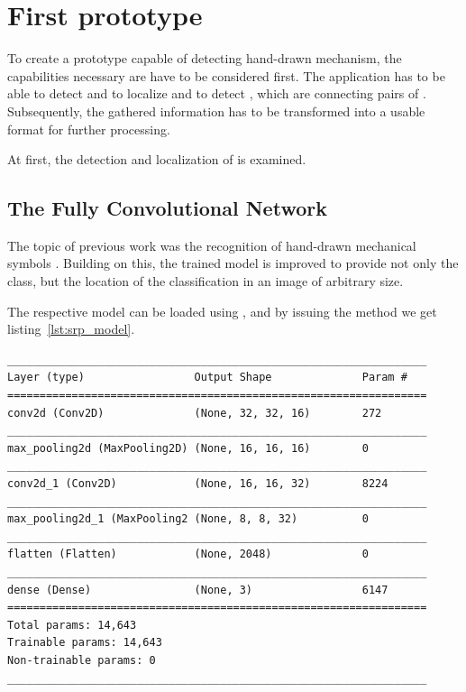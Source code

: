 \section{First prototype} \label{ch:first_prototype}

To create a prototype capable of detecting hand-drawn mechanism, the capabilities necessary are have to be considered first.
The application has to be able to detect and to localize  and to detect , which are connecting pairs of .
Subsequently, the gathered information has to be transformed into a usable format for further processing.

At first, the detection and localization of  is examined.

\subsection{The Fully Convolutional Network}\label{ch:fcn}

The topic of previous work was the recognition of hand-drawn mechanical symbols \cite{Lawrence2020}.
Building on this, the trained model is improved to provide not only the class, but the location of the classification in an image of arbitrary size.

The respective model can be loaded using , %
 and by issuing the  method we get listing~\ref{lst:srp_model}.

\begin{lstlisting}[caption={Summary of Symbol Classifier.}, label={lst:srp_model}]
_________________________________________________________________
Layer (type)                 Output Shape              Param #
=================================================================
conv2d (Conv2D)              (None, 32, 32, 16)        272
_________________________________________________________________
max_pooling2d (MaxPooling2D) (None, 16, 16, 16)        0
_________________________________________________________________
conv2d_1 (Conv2D)            (None, 16, 16, 32)        8224
_________________________________________________________________
max_pooling2d_1 (MaxPooling2 (None, 8, 8, 32)          0
_________________________________________________________________
flatten (Flatten)            (None, 2048)              0
_________________________________________________________________
dense (Dense)                (None, 3)                 6147
=================================================================
Total params: 14,643
Trainable params: 14,643
Non-trainable params: 0
_________________________________________________________________
\end{lstlisting}

